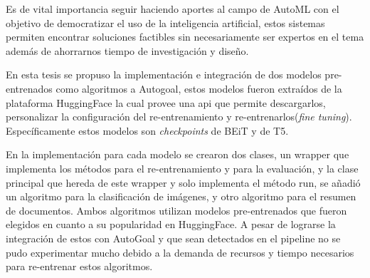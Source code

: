 \begin{conclusions}
    Es de vital importancia seguir haciendo aportes al campo de AutoML con el objetivo de democratizar el uso de la inteligencia artificial, estos sistemas permiten encontrar soluciones factibles sin necesariamente ser expertos en el tema además de ahorrarnos tiempo de investigación y diseño.

    En esta tesis se propuso la implementación e integración de dos modelos pre-entrenados como algoritmos a Autogoal, estos modelos fueron extraídos de la plataforma HuggingFace la cual provee una api que permite descargarlos, personalizar la configuración del re-entrenamiento y re-entrenarlos(\textit{fine tuning}). Específicamente estos modelos son \textit{checkpoints} de BEiT y de T5. 

    En la implementación para cada modelo se crearon dos clases, un wrapper que implementa los métodos para el re-entrenamiento y para la evaluación, y la clase principal que hereda de este wrapper y solo implementa el método run, se añadió un algoritmo para la clasificación de imágenes, y otro algoritmo para el resumen de documentos. Ambos algoritmos utilizan modelos pre-entrenados que fueron elegidos en cuanto a su popularidad en HuggingFace. A pesar de lograrse la integración de estos con AutoGoal y que sean detectados en el pipeline no se pudo experimentar mucho debido a la demanda de recursos y tiempo necesarios para re-entrenar estos algoritmos.
\end{conclusions}
